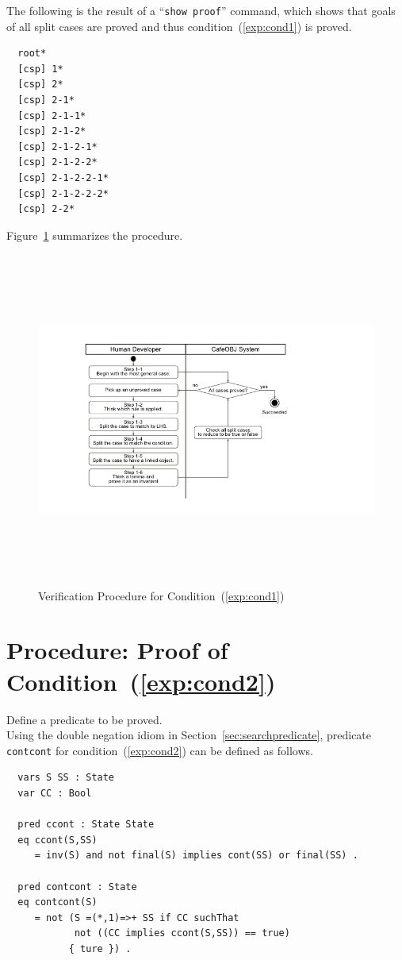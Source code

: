 \documentclass[12pt]{report}
\newcommand{\stt}[1]{{\small{\tt {#1}}}}
\begin{document}
The following is the result of a ``\stt{show proof}'' command, which shows
that goals of all split cases are proved and thus
condition~(\ref{exp:cond1}) is proved.
\begin{verbatim}
  root*
  [csp] 1*
  [csp] 2*
  [csp] 2-1*
  [csp] 2-1-1*
  [csp] 2-1-2*
  [csp] 2-1-2-1*
  [csp] 2-1-2-2*
  [csp] 2-1-2-2-1*
  [csp] 2-1-2-2-2*
  [csp] 2-2*
\end{verbatim}

Figure~\ref{fig:procedure} summarizes the procedure.
\begin{figure}
\centering
\includegraphics[height=11cm,natwidth=720,natheight=405,clip,trim=100 55 190 40]{procedure1.png}
\caption{Verification Procedure for Condition~(\ref{exp:cond1})}
\label{fig:procedure}
\end{figure}
\section{Procedure: Proof of Condition~(\ref{exp:cond2})}
\label{sec:contcont}
 Define a predicate to be proved. \\ Using the
double negation idiom in Section~\ref{sec:searchpredicate}, predicate
{\tt contcont} for condition~(\ref{exp:cond2}) can be defined as follows.
\begin{verbatim}
  vars S SS : State
  var CC : Bool

  pred ccont : State State
  eq ccont(S,SS)
     = inv(S) and not final(S) implies cont(SS) or final(SS) .

  pred contcont : State
  eq contcont(S)
     = not (S =(*,1)=>+ SS if CC suchThat
            not ((CC implies ccont(S,SS)) == true)
     	   { ture }) .
\end{verbatim}
\end{document}
